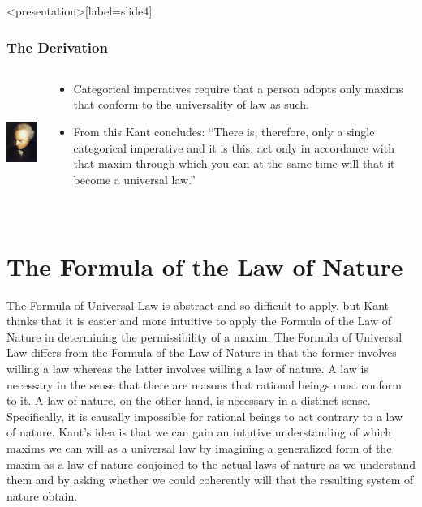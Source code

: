 \begin{frame}<presentation>[label=slide4]
    \frametitle{The Derivation}
        \begin{columns}
            \begin{column}{3cm}
                \includegraphics[height=4cm]{../../graphics/kant.jpg}
            \end{column}
            \begin{column}{7cm}
                \begin{itemize}
                    \item<1-> \alert{Categorical imperatives} require that a person adopts only maxims that conform to the universality of law as such.
                    \item<2-> From this Kant concludes: ``There is, therefore, only a single categorical imperative and it is this: \alert{act only in accordance with that maxim through which you can at the same time will that it become a universal law.}''
                \end{itemize}
            \end{column}
        \end{columns}
\end{frame}


\section{The Formula of the Law of Nature}\label{sec:the_formula_of_the_law_of_nature} %

The Formula of Universal Law is abstract and so difficult to apply, but Kant thinks that it is easier and more intuitive to apply the Formula of the Law of Nature in determining the permissibility of a maxim. The Formula of Universal Law differs from the Formula of the Law of Nature in that the former involves willing a law whereas the latter involves willing a law of nature. A law is necessary in the sense that there are reasons that rational beings must conform to it. A law of nature, on the other hand, is necessary in a distinct sense. Specifically, it is causally impossible for rational beings to act contrary to a law of nature. Kant's idea is that we can gain an intutive understanding of which maxims we can will as a universal law by imagining a generalized form of the maxim as a law of nature conjoined to the actual laws of nature as we understand them and by asking whether we could coherently will that the resulting system of nature obtain. \change

